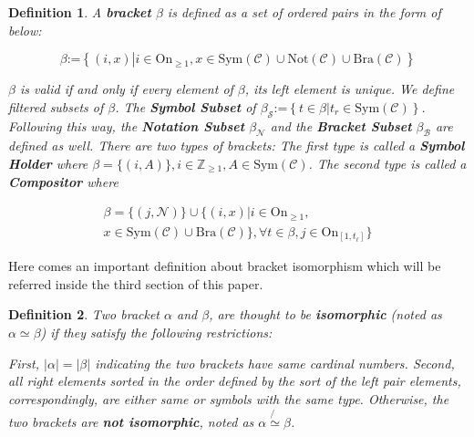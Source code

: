 \documentclass{aims}
\numberwithin{equation}{section}
\newtheorem{definition}{Definition}	%
\numberwithin{theorem}{section}	%
\numberwithin{axiom}{section}	%
\numberwithin{definition}{section}	%
\begin{document}
	\begin{definition}
		A \textbf{ bracket} \(\beta\) is defined as a set of ordered pairs in the form of below:
		
		\begin{equation}
			\beta \text{:=}\left\{(i,x)\left|i\in \text{On}_{\geq 1}\right.,x\in \text{Sym}(\mathcal{C})\cup \text{Not}(\mathcal{C})\cup \text{Bra}(\mathcal{C})\right\}
		\end{equation}
		
		\(\beta\) is valid if and only if every element of \(\beta\), its left element is unique. We define filtered subsets of \(\beta\). The \textbf{ Symbol Subset} of \(\beta _{\mathcal{S}}\text{:=}\left\{t\in \beta \left|t_{\mathit{r}}\in \text{Sym}(\mathcal{C})\right.\right\}\). Following this way, the \textbf{ Notation Subset} \(\beta _{\mathcal{N}}\) and the \textbf{ Bracket Subset} \(\beta _{\mathcal{B}}\) are defined as well. There are two types of brackets: The first type is called a \textbf{ Symbol Holder} where \(\beta =\{(i,A)\},i\in \mathbb{Z}_{\geq 1},A\in \text{Sym}(\mathcal{C})\). The second type is called a \textbf{ Compositor} where
		
		\begin{equation}
			\begin{split}
				\beta =\{(j,\mathcal{N})\}\cup \{(i,x)|i\in \text{On}_{\geq 1},\\ x\in \text{Sym}(\mathcal{C})\cup \text{Bra}(\mathcal{C})\},\forall
				t\in \beta ,j\in \text{On}_{[1,t_{\ell }]}\}
			\end{split}
		\end{equation}
	\end{definition}
	
	Here comes an important definition about bracket isomorphism which will be referred inside the third section of this paper.
	
	\begin{definition}
		Two bracket \(\alpha\) and \(\beta\), are thought to be \textbf{ isomorphic} (noted as \(\alpha \simeq \beta\)) if they satisfy the following restrictions:
		
		First, \(|\alpha |=|\beta |\) indicating the two brackets have same cardinal numbers. Second, all right elements sorted in the order defined by the sort of the left pair elements, correspondingly, are either same or symbols with the same type. Otherwise, the two brackets are \textbf{ not isomorphic}, noted as \(\alpha \not{\simeq}\beta\).
	\end{definition}
	
\end{document}
